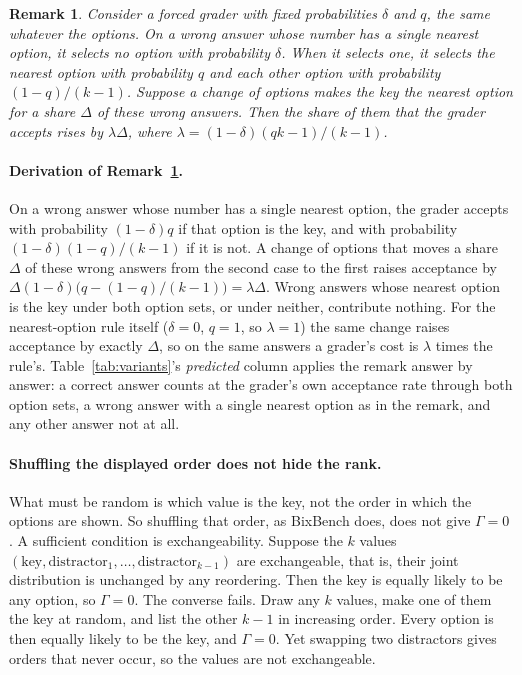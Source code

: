 \documentclass{article}
\newtheorem{remark}{Remark}
\begin{document}
\begin{remark}
\label{rem:lambda}
Consider a forced grader with fixed probabilities $\delta$ and $q$, the same whatever the options. On a wrong answer
whose number has a single nearest option, it selects no option with probability $\delta$. When it selects one, it selects the nearest option
with probability $q$ and each other option with probability $(1-q)/(k-1)$. Suppose a change of options makes the key
the nearest option for a share $\Delta$ of these wrong answers. Then the share of them that the grader accepts rises
by $\lambda\Delta$, where $\lambda=(1-\delta)(qk-1)/(k-1)$.
\end{remark}

\paragraph{Derivation of Remark~\ref{rem:lambda}.} On a wrong answer whose number has a single nearest option, the
grader accepts with probability $(1-\delta)q$ if that option is the key, and with probability $(1-\delta)(1-q)/(k-1)$
if it is not. A change of options that moves a share $\Delta$ of these wrong answers from the second case to the
first raises acceptance by $\Delta(1-\delta)\big(q-(1-q)/(k-1)\big)=\lambda\Delta$. Wrong answers whose nearest option
is the key under both option sets, or under neither, contribute nothing. For the nearest-option rule itself
($\delta=0$, $q=1$, so $\lambda=1$) the same change raises acceptance by exactly $\Delta$, so on the same answers a
grader's cost is $\lambda$ times the rule's. Table~\ref{tab:variants}'s \emph{predicted} column applies the remark
answer by answer: a correct answer counts at the grader's own acceptance rate through both option sets, a wrong answer
with a single nearest option as in the remark, and any other answer not at all.

\paragraph{Shuffling the displayed order does not hide the rank.} What must be random is which value is the key, not
the order in which the options are shown. So shuffling that order, as BixBench does, does not give $\Gamma=0$. A
sufficient condition is exchangeability. Suppose the $k$ values
$(\text{key},\text{distractor}_1,\dots,\text{distractor}_{k-1})$ are exchangeable, that is, their joint distribution
is unchanged by any reordering. Then the key is equally likely to be any option, so $\Gamma=0$. The converse fails.
Draw any $k$ values, make one of them the key at random, and list the other $k-1$ in increasing order. Every option
is then equally likely to be the key, and $\Gamma=0$. Yet swapping two distractors gives orders that never occur, so
the values are not exchangeable.
\end{document}

